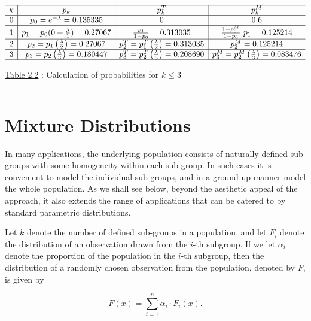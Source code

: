 \documentclass[]{book}
\theoremstyle{definition}
\theoremstyle{definition}
\theoremstyle{definition}
\theoremstyle{remark}
\begin{document}
\[\begin{matrix}
\begin{array}{c|c|c|c}
\hline
k & p_k & p_k^T & p_k^M\\\hline
0 & p_0=e^{-\lambda}=0.135335 & 0 & 0.6\\\hline
1 & p_1=p_0(0+\frac{\lambda}{1})=0.27067 &
\frac{p_1}{1-p_0}=0.313035 &
\frac{1-p_0^M}{1-p_0}~p_1=0.125214\\\hline
2 & p_2=p_1\left( \frac{\lambda}{2}\right)=0.27067 &
p_2^T=p_1^T\left(\frac{\lambda}{2}\right)=0.313035 &
p_2^M=0.125214\\\hline
3 & p_3=p_2\left(\frac{\lambda}{3}\right)=0.180447 &
p_3^T=p_2^T\left(\frac{\lambda}{3}\right)=0.208690 &
p_3^M=p_2^M\left(\frac{\lambda}{3}\right)=0.083476\\\hline
\end{array}
\end{matrix}\]

\protect\hyperlink{tab:2.2}{Table 2.2} : Calculation of probabilities
for \(k\leq 3\)

\begin{center}\rule{0.5\linewidth}{\linethickness}\end{center}

\section{Mixture Distributions}\label{S:mixture-distributions}

In many applications, the underlying population consists of naturally
defined sub-groups with some homogeneity within each sub-group. In such
cases it is convenient to model the individual sub-groups, and in a
ground-up manner model the whole population. As we shall see below,
beyond the aesthetic appeal of the approach, it also extends the range
of applications that can be catered to by standard parametric
distributions.

Let \(k\) denote the number of defined sub-groups in a population, and
let \(F_i\) denote the distribution of an observation drawn from the
\(i\)-th subgroup. If we let \(\alpha_i\) denote the proportion of the
population in the \(i\)-th subgroup, then the distribution of a randomly
chosen observation from the population, denoted by \(F\), is given by

\begin{equation}
F(x)=\sum_{i=1}^n \alpha_i \cdot F_i(x).
\label{eq:mixdefn}
\end{equation}
\end{document}
